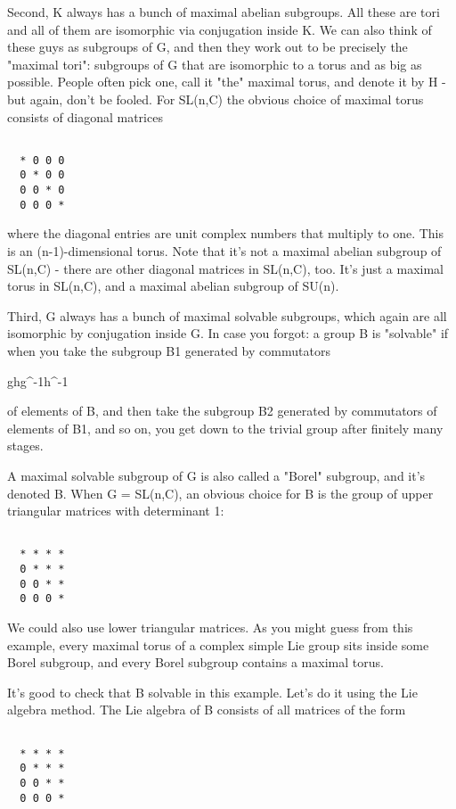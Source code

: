 Second, K always has a bunch of maximal abelian subgroups.  All
these are tori and all of them are isomorphic via conjugation inside K.
We can also think of these guys as subgroups of G, and then they work
out to be precisely the "maximal tori": subgroups of G that
are isomorphic to a torus and as big as possible.  People often pick
one, call it "the" maximal torus, and denote it by H - but
again, don't be fooled.  For SL(n,C) the obvious choice of maximal torus
consists of diagonal matrices


\begin{verbatim}

  * 0 0 0 
  0 * 0 0 
  0 0 * 0 
  0 0 0 *
\end{verbatim}
    
where the diagonal entries are unit complex numbers that multiply to
one.  This is an (n-1)-dimensional torus.  Note that it's not a maximal
abelian subgroup of SL(n,C) - there are other diagonal matrices in
SL(n,C), too.  It's just a maximal torus in SL(n,C), and a maximal
abelian subgroup of SU(n).

Third, G always has a bunch of maximal solvable subgroups, which again
are all isomorphic by conjugation inside G.  In case you forgot: a group
B is "solvable" if when you take the subgroup B1 generated by
commutators

ghg^{-1}h^{-1}

of elements of B, and then take the subgroup B2 generated by commutators
of elements of B1, and so on, you get down to the trivial group after
finitely many stages.  

A maximal solvable subgroup of G is also called a "Borel"
subgroup, and it's denoted B.  When G = SL(n,C), an obvious choice for B
is the group of upper triangular matrices with determinant 1:


\begin{verbatim}

  * * * *
  0 * * *
  0 0 * *
  0 0 0 *
\end{verbatim}
    
We could also use lower triangular matrices.  As you might guess from
this example, every maximal torus of a complex simple Lie group sits
inside some Borel subgroup, and every Borel subgroup contains a maximal
torus.

It's good to check that B solvable in this example.  Let's do it
using the Lie algebra method.  The Lie algebra of B consists of 
all matrices of the form


\begin{verbatim}

  * * * *
  0 * * *
  0 0 * *
  0 0 0 *
\end{verbatim}
    
